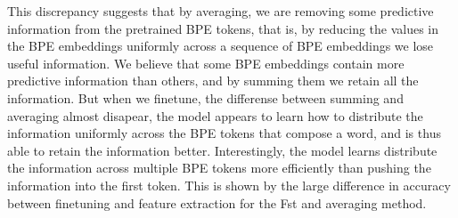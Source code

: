 \documentclass[11pt]{article}
\begin{document}
                This discrepancy suggests that by averaging, we are
     removing some predictive information from the pretrained BPE
     tokens, that is, by reducing the values in the BPE embeddings
     uniformly across a sequence of BPE embeddings we lose useful
     information.
        We believe that some BPE embeddings contain more predictive
     information than others, and by summing them we retain all the
     information.
                     But when we finetune, the differense between
     summing and averaging almost disapear, the model appears to learn
     how to distribute the information uniformly across the BPE tokens
     that compose a word, and is thus able to retain the information
     better. Interestingly, the model learns distribute the
     information across multiple BPE tokens more efficiently than
     pushing the information into the first token. This is shown by
     the large difference in accuracy between finetuning and feature extraction
     for the Fst and averaging method.
   
\end{document}
